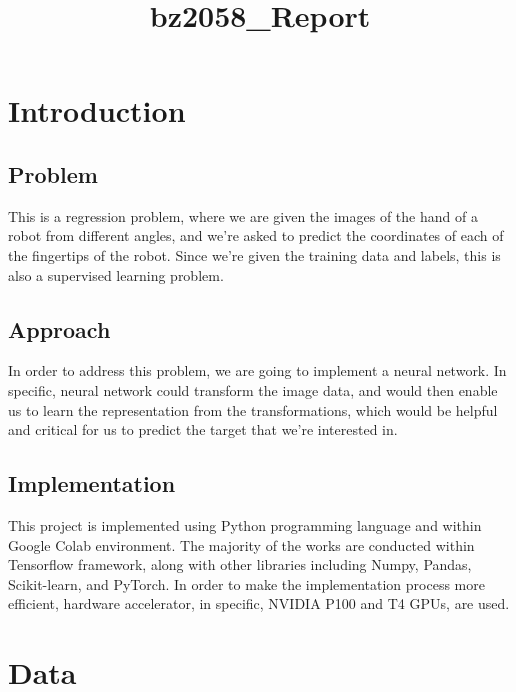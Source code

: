 \documentclass[11pt]{article}
\title{bz2058\_Report}
\begin{document}
    
    \maketitle
    
    

    
    \hypertarget{introduction}{%
\section{Introduction}\label{introduction}}

    \hypertarget{problem}{%
\subsection{Problem}\label{problem}}

This is a regression problem, where we are given the images of the hand
of a robot from different angles, and we're asked to predict the
coordinates of each of the fingertips of the robot. Since we're given
the training data and labels, this is also a supervised learning
problem.

    \hypertarget{approach}{%
\subsection{Approach}\label{approach}}

In order to address this problem, we are going to implement a neural
network. In specific, neural network could transform the image data, and
would then enable us to learn the representation from the
transformations, which would be helpful and critical for us to predict
the target that we're interested in.

    \hypertarget{implementation}{%
\subsection{Implementation}\label{implementation}}

This project is implemented using Python programming language and within
Google Colab environment. The majority of the works are conducted within
Tensorflow framework, along with other libraries including Numpy,
Pandas, Scikit-learn, and PyTorch. In order to make the implementation
process more efficient, hardware accelerator, in specific, NVIDIA P100
and T4 GPUs, are used.

    \hypertarget{data}{%
\section{Data}\label{data}}
\end{document}
